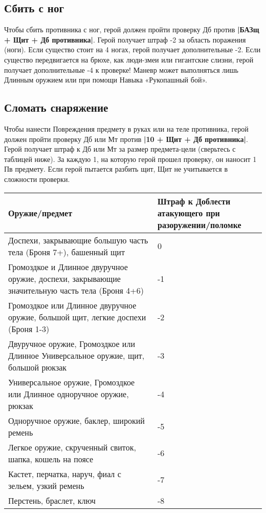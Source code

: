 \subsection{Сбить с ног}
Чтобы сбить противника с ног, герой должен пройти проверку Дб против \textbf{|БАЗщ + Щит + Дб противника|}.
\newline
Герой получает штраф -2 за область поражения (ноги). Если существо стоит на 4 ногах, герой получает дополнительные -2. Если существо передвигается на брюхе, как люди-змеи или гигантские слизни, герой получает дополнительные -4 к проверке! Маневр может выполняться лишь Длинным оружием или при помощи Навыка «Рукопашный бой».
\subsection{Сломать снаряжение}
Чтобы нанести Повреждения предмету в руках или на теле противника, герой должен пройти проверку Дб или Мт против \textbf{|10 + Щит + Дб противника|}.
\newline
Герой получает штраф к Дб или Мт за размер предмета-цели (сверьтесь с таблицей ниже). За каждую 1, на которую герой прошел проверку, он наносит 1 Пв предмету. Если герой пытается разбить щит, Щит не учитывается в сложности проверки. 
\begin{center}
\begin{tabular}{|p{10cm}|p{4cm}|}
\hline
Оружие/предмет & Штраф к Доблести атакующего при разоружении/поломке \\ \hline
Доспехи, закрывающие большую часть тела (Броня 7+), башенный щит & 0 \\ \hline
Громоздкое и Длинное двуручное оружие, доспехи, закрывающие значительную часть тела (Броня 4+6) & -1 \\ \hline
Громоздкое или Длинное двуручное оружие, большой щит, легкие доспехи (Броня 1-3) & -2 \\ \hline
Двуручное оружие, Громоздкое или Длинное Универсальное оружие, щит, большой рюкзак & -3 \\ \hline
Универсальное оружие, Громоздкое или Длинное одноручное оружие, рюкзак & -4 \\ \hline
Одноручное оружие, баклер, широкий ремень & -5 \\ \hline
Легкое оружие, скрученный свиток, шапка, кошель на поясе & -6 \\ \hline
Кастет, перчатка, наруч, фиал с зельем, узкий ремень & -7 \\ \hline
Перстень, браслет, ключ & -8 \\ \hline
\end{tabular}
\end{center}

